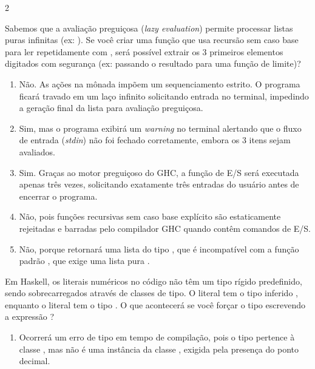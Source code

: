 \documentclass[a4paper,10pt,brazil]{article}
\begin{document}
\begin{multicols}{2}
\begin{enumerate}
\end{enumerate}

Sabemos que a avaliação preguiçosa (\emph{lazy evaluation}) permite processar listas puras infinitas (ex: ). 
Se você criar uma função  que usa recursão sem caso base para ler repetidamente com , será possível extrair os 3 primeiros elementos digitados com segurança (ex: passando o resultado para uma função de limite)?

\begin{enumerate}
  \item Não. As ações na mônada  impõem um sequenciamento estrito. O programa ficará travado em um laço infinito solicitando entrada no terminal, impedindo a geração final da lista para avaliação preguiçosa.

  \item Sim, mas o programa exibirá um \emph{warning} no terminal alertando que o fluxo de entrada (\emph{stdin}) não foi fechado corretamente, embora os 3 itens sejam avaliados.

  \item Sim. Graças ao motor preguiçoso do GHC, a função de E/S será executada apenas três vezes, solicitando exatamente três entradas do usuário antes de encerrar o programa.

  \item Não, pois funções recursivas sem caso base explícito são estaticamente rejeitadas e barradas pelo compilador GHC quando contêm comandos de E/S.

  \item Não, porque  retornará uma lista do tipo \haskellinline{[IO String]}, que é incompatível com a função padrão , que exige uma lista pura \haskellinline{[a]}.


\end{enumerate}

Em Haskell, os literais numéricos no código não têm um tipo rígido predefinido, sendo sobrecarregados através de classes de tipo. O literal  tem o tipo inferido , enquanto o literal  tem o tipo . 
O que acontecerá se você forçar o tipo escrevendo a expressão ?

\begin{enumerate}
  \item Ocorrerá um erro de tipo em tempo de compilação, pois o tipo  pertence à classe , mas não é uma instância da classe , exigida pela presença do ponto decimal.


\end{enumerate}
\end{multicols}
\end{document}
